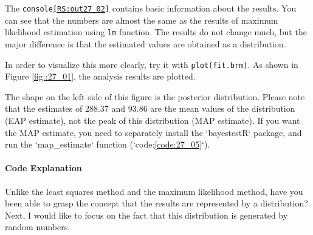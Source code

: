 \documentclass{ltjsarticle}
\begin{document}
The \texttt{console\ref{RS:out27_02}} contains basic information about the results. You can see that the numbers are almost the same as the results of maximum likelihood estimation using \texttt{lm} function. The results do not change much, but the major difference is that the estimated values are obtained as a distribution.

In order to visualize this more clearly, try it with \texttt{plot(fit.brm)}. As shown in Figure \ref{fig::27_01}, the analysis results are plotted.

The shape on the left side of this figure is the posterior distribution. Please note that the estimates of 288.37 and 93.86 are the mean values of the distribution (EAP estimate), not the peak of this distribution (MAP estimate). If you want the MAP estimate, you need to separately install the `bayestestR` package\parencite{bayestestR}, and run the `map_estimate` function (`code:\ref{code:27_05}`).


\paragraph{Code Explanation}


Unlike the least squares method and the maximum likelihood method, have you been able to grasp the concept that the results are represented by a distribution? Next, I would like to focus on the fact that this distribution is generated by random numbers.
\end{document}
